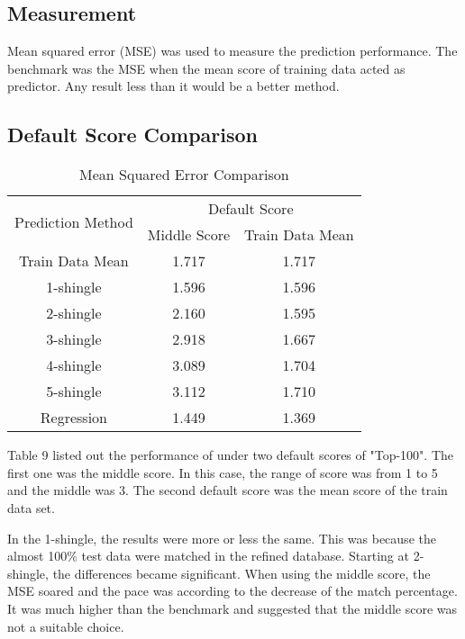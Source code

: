 \subsection{Measurement}
Mean squared error (MSE) was used to measure the prediction performance. The benchmark was the MSE when the mean score of training data acted as predictor. Any result less than it would be a better method.

\subsection{Default Score Comparison}

\begin{table}[H]
\caption{Mean Squared Error Comparison}
		\begin{tabular}{ccc}
			\toprule
				\multirow{2}{*}{Prediction Method} &
				\multicolumn{2}{c}{Default Score}\\
				\cline{2-3}
				& Middle Score & Train Data Mean \\
			\midrule
				Train Data Mean & 1.717 & 1.717 \\
				\hline
				1-shingle & 1.596 & 1.596\\
				2-shingle & 2.160 & 1.595\\
				3-shingle & 2.918 & 1.667\\
				4-shingle & 3.089 & 1.704\\
				5-shingle & 3.112 & 1.710\\
				\hline
				Regression & 1.449 & 1.369\\
				
			\bottomrule
		\end{tabular}

\end{table}

Table 9 listed out the performance of under two default scores of "Top-100". The first one was the middle score. In this case, the range of score was from 1 to 5 and the middle was 3. The second default score was the mean score of the train data set.

In the 1-shingle, the results were more or less the same. This was because the almost 100\% test data were matched in the refined database. 
Starting at 2-shingle, the differences became significant. When using the middle score, the MSE soared and the pace was according to the decrease of the match percentage. It was much higher than the benchmark and suggested that the middle score was not a suitable choice.


